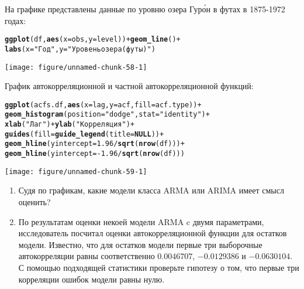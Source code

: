 \documentclass[pdftex,11pt,openany]{book}\usepackage[]{graphicx}\usepackage[]{color}
\makeatletter
\def\maxwidth{ %
  \ifdim\Gin@nat@width>\linewidth
    \linewidth
  \else
    \Gin@nat@width
  \fi
}
\newcommand{\hlnum}[1]{\textcolor[rgb]{0.686,0.059,0.569}{#1}}%
\newcommand{\hlstr}[1]{\textcolor[rgb]{0.192,0.494,0.8}{#1}}%
\newcommand{\hlopt}[1]{\textcolor[rgb]{0,0,0}{#1}}%
\newcommand{\hlstd}[1]{\textcolor[rgb]{0.345,0.345,0.345}{#1}}%
\newcommand{\hlkwa}[1]{\textcolor[rgb]{0.161,0.373,0.58}{\textbf{#1}}}%
\newcommand{\hlkwc}[1]{\textcolor[rgb]{0.333,0.667,0.333}{#1}}%
\newcommand{\hlkwd}[1]{\textcolor[rgb]{0.737,0.353,0.396}{\textbf{#1}}}%
\newenvironment{kframe}{%
 \def\at@end@of@kframe{}%
 \ifinner\ifhmode%
  \def\at@end@of@kframe{\end{minipage}}%
  \begin{minipage}{\columnwidth}%
 \fi\fi%
 \def\FrameCommand##1{\hskip\@totalleftmargin \hskip-\fboxsep
 \colorbox{shadecolor}{##1}\hskip-\fboxsep
     \hskip-\linewidth \hskip-\@totalleftmargin \hskip\columnwidth}%
 \MakeFramed {\advance\hsize-\width
   \@totalleftmargin\z@ \linewidth\hsize
   \@setminipage}}%
 {\par\unskip\endMakeFramed%
 \at@end@of@kframe}
\newenvironment{knitrout}{}{} %
\makeatother
\begin{document}
\begin{solution}
\end{solution}


\begin{problem}
На графике представлены данные по уровню озера Гур\'{о}н в футах в 1875-1972 годах:  



\begin{knitrout}
\color{fgcolor}\begin{kframe}
\begin{alltt}
\hlkwd{ggplot}\hlstd{(df,}\hlkwd{aes}\hlstd{(}\hlkwc{x}\hlstd{=obs,}\hlkwc{y}\hlstd{=level))}\hlopt{+}\hlkwd{geom_line}\hlstd{()}\hlopt{+}
    \hlkwd{labs}\hlstd{(}\hlkwc{x}\hlstd{=}\hlstr{"Год"}\hlstd{,}\hlkwc{y}\hlstd{=}\hlstr{"Уровень озера (футы)"}\hlstd{)}
\end{alltt}
\end{kframe}
\texttt{[image: figure/unnamed-chunk-58-1]} 

\end{knitrout}

График автокорреляционной и частной автокорреляционной функций:

\begin{knitrout}
\color{fgcolor}\begin{kframe}
\begin{alltt}
\hlkwd{ggplot}\hlstd{(acfs.df,}\hlkwd{aes}\hlstd{(}\hlkwc{x}\hlstd{=lag,}\hlkwc{y}\hlstd{=acf,}\hlkwc{fill}\hlstd{=acf.type))}\hlopt{+}
    \hlkwd{geom_histogram}\hlstd{(}\hlkwc{position}\hlstd{=}\hlstr{"dodge"}\hlstd{,}\hlkwc{stat}\hlstd{=}\hlstr{"identity"}\hlstd{)}\hlopt{+}
  \hlkwd{xlab}\hlstd{(}\hlstr{"Лаг"}\hlstd{)}\hlopt{+}\hlkwd{ylab}\hlstd{(}\hlstr{"Корреляция"}\hlstd{)} \hlopt{+}
  \hlkwd{guides}\hlstd{(}\hlkwc{fill}\hlstd{=}\hlkwd{guide_legend}\hlstd{(}\hlkwc{title}\hlstd{=}\hlkwa{NULL}\hlstd{))}\hlopt{+}
  \hlkwd{geom_hline}\hlstd{(}\hlkwc{yintercept}\hlstd{=}\hlnum{1.96}\hlopt{/}\hlkwd{sqrt}\hlstd{(}\hlkwd{nrow}\hlstd{(df)))}\hlopt{+}
  \hlkwd{geom_hline}\hlstd{(}\hlkwc{yintercept}\hlstd{=}\hlopt{-}\hlnum{1.96}\hlopt{/}\hlkwd{sqrt}\hlstd{(}\hlkwd{nrow}\hlstd{(df)))}
\end{alltt}
\end{kframe}
\texttt{[image: figure/unnamed-chunk-59-1]} 

\end{knitrout}


\begin{enumerate}
\item Судя по графикам, какие модели класса ARMA или ARIMA имеет смысл оценить?
\item По результатам оценки некоей модели ARMA c двумя параметрами, исследователь посчитал оценки автокорреляционной функции для остатков модели. Известно, что для остатков модели первые три выборочные автокорреляции равны соответственно $0.0046707$, $\ensuremath{-0.0129386}$ и $\ensuremath{-0.0630104}$. С помощью подходящей статистики проверьте гипотезу о том, что первые три корреляции ошибок модели равны нулю.
\end{enumerate}
\end{problem}
\end{document}
